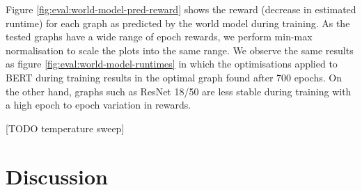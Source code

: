 Figure \ref{fig:eval:world-model-pred-reward} shows the reward (decrease in estimated runtime) for each graph as predicted by the world model during training. As the tested graphs have a wide range of epoch rewards, we perform min-max normalisation to scale the plots into the same range. We observe the same results as figure \ref{fig:eval:world-model-runtimes} in which the optimisations applied to BERT during training results in the optimal graph found after 700 epochs. On the other hand, graphs such as ResNet 18/50 are less stable during training with a high epoch to epoch variation in rewards.

[TODO temperature sweep]

\section{Discussion}

